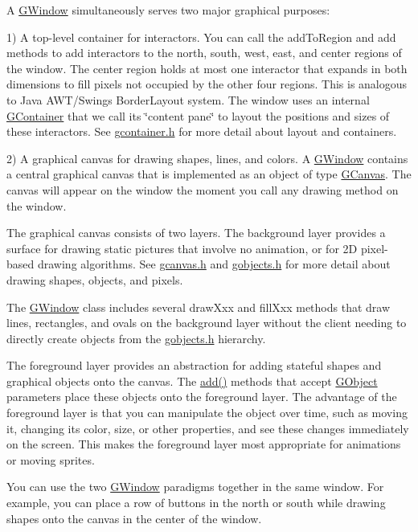 A \mbox{\hyperlink{classGWindow}{G\+Window}} simultaneously serves two major graphical purposes\+:

1) A top-\/level container for interactors. You can call the add\+To\+Region and add methods to add interactors to the north, south, west, east, and center regions of the window. The center region holds at most one interactor that expands in both dimensions to fill pixels not occupied by the other four regions. This is analogous to Java A\+W\+T/\+Swing\textquotesingle{}s Border\+Layout system. The window uses an internal \mbox{\hyperlink{classGContainer}{G\+Container}} that we call its \char`\"{}content pane\char`\"{} to layout the positions and sizes of these interactors. See \mbox{\hyperlink{gcontainer_8h_source}{gcontainer.\+h}} for more detail about layout and containers.

2) A graphical canvas for drawing shapes, lines, and colors. A \mbox{\hyperlink{classGWindow}{G\+Window}} contains a central graphical canvas that is implemented as an object of type \mbox{\hyperlink{classGCanvas}{G\+Canvas}}. The canvas will appear on the window the moment you call any drawing method on the window.

The graphical canvas consists of two layers. The background layer provides a surface for drawing static pictures that involve no animation, or for 2D pixel-\/based drawing algorithms. See \mbox{\hyperlink{gcanvas_8h_source}{gcanvas.\+h}} and \mbox{\hyperlink{gobjects_8h_source}{gobjects.\+h}} for more detail about drawing shapes, objects, and pixels.

The \mbox{\hyperlink{classGWindow}{G\+Window}} class includes several draw\+Xxx and fill\+Xxx methods that draw lines, rectangles, and ovals on the background layer without the client needing to directly create objects from the \mbox{\hyperlink{gobjects_8h_source}{gobjects.\+h}} hierarchy.

The foreground layer provides an abstraction for adding stateful shapes and graphical objects onto the canvas. The \mbox{\hyperlink{classGWindow_a6f99b7c841256dbdc5acaafbbca4e685}{add()}} methods that accept \mbox{\hyperlink{classGObject}{G\+Object}} parameters place these objects onto the foreground layer. The advantage of the foreground layer is that you can manipulate the object over time, such as moving it, changing its color, size, or other properties, and see these changes immediately on the screen. This makes the foreground layer most appropriate for animations or moving sprites.

You can use the two \mbox{\hyperlink{classGWindow}{G\+Window}} paradigms together in the same window. For example, you can place a row of buttons in the north or south while drawing shapes onto the canvas in the center of the window.

